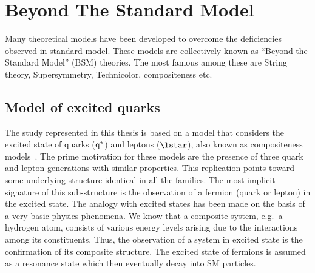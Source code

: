 \section{Beyond The Standard Model}
Many theoretical models have been developed to overcome the deficiencies observed in standard model. These models are collectively known as ``Beyond the Standard Model''
(BSM) theories. The most famous among these are String theory, Supersymmetry, Technicolor, compositeness etc.
\subsection{Model of excited quarks}
The study represented in this thesis is based on a model that considers the excited state of quarks ($\mathrm{q^\star}$) and leptons ($\lstar$),
also known as compositeness models~\cite{Pati:1975md, Eichten:1983hw, Baur:1987ga, Baur:1989kv}.
The prime motivation for these models are the presence of three quark and lepton generations with similar properties. This replication points toward
some underlying structure identical in all the families. The most implicit signature of this sub-structure is the observation of a fermion (quark or lepton)
in the excited state. The analogy with excited states has been made on the basis of a very basic physics phenomena. We know that a composite system,
e.g.\ a hydrogen atom, consists of various energy levels arising due to the interactions among its constituents. Thus, the
observation of a system in excited state is the confirmation of its composite structure.
The excited state of fermions is assumed as a resonance state which then eventually decay into SM particles. 

